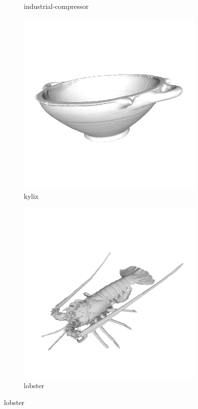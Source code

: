 \begin{figure}[!h]
\begin{subfigure}[b]{0.23\linewidth}
		\caption{industrial-compressor}
	\end{subfigure}
	\begin{subfigure}[b]{0.23\linewidth}
		\includegraphics[width=\linewidth]{./Figures/train-dataset/26.kylix.png}
		\caption{kylix}
	\end{subfigure}
	\begin{subfigure}[b]{0.23\linewidth}
		\includegraphics[width=\linewidth]{./Figures/train-dataset/27.lobster.png}
		\caption{lobster}
	\end{subfigure}


\end{figure}
